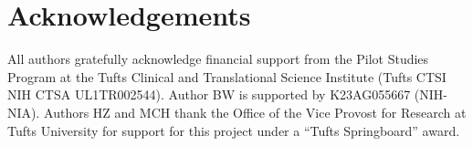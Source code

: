 \section*{Acknowledgements}

All authors gratefully acknowledge financial support from
the Pilot Studies Program at the Tufts Clinical and Translational Science Institute
(Tufts CTSI NIH CTSA UL1TR002544).
Author BW is supported by K23AG055667 (NIH-NIA). 
Authors HZ and MCH thank the Office of the Vice Provost for Research at Tufts University for support for this project under a ``Tufts Springboard'' award.